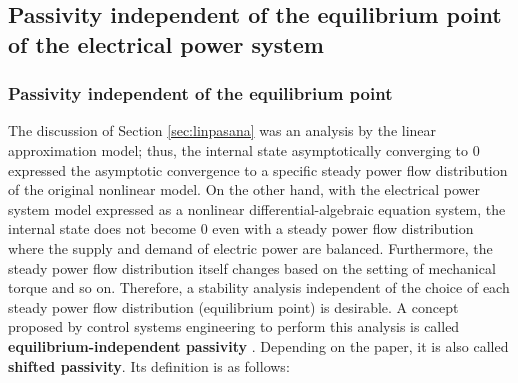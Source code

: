 \documentclass[graybox, envcountchap]{svmult}
\begin{document}
\subsection{Passivity independent of the equilibrium point of the electrical power system\advanced}

\smallskip
\subsubsection{Passivity independent of the equilibrium point}

The discussion of Section \ref{sec:linpasana} was an analysis by the linear approximation model; thus, the internal state asymptotically converging to 0 expressed the asymptotic convergence to a specific steady power flow distribution of the original nonlinear model.
On the other hand, with the electrical power system model expressed as a nonlinear differential-algebraic equation system, the internal state does not become 0 even with a steady power flow distribution where the supply and demand of electric power are balanced.
Furthermore, the steady power flow distribution itself changes based on the setting of mechanical torque and so on.
Therefore, a stability analysis independent of the choice of each steady power flow distribution (equilibrium point) is desirable. A concept proposed by control systems engineering to perform this analysis is called \textbf{equilibrium-independent passivity} \cite{hines2011equilibrium,simpson2019equilibrium}. Depending on the paper, it is also called \textbf{shifted passivity}. Its definition is as follows:
\end{document}

